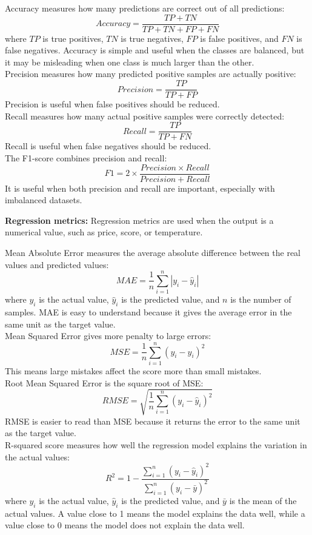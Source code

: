\documentclass[12pt,a4paper,oneside]{report}
\begin{document}
\noindent Accuracy measures how many predictions are correct out of all predictions:
\[
Accuracy = \frac{TP + TN}{TP + TN + FP + FN}
\]
\noindent where $TP$ is true positives, $TN$ is true negatives, $FP$ is false positives,
and $FN$ is false negatives. Accuracy is simple and useful when the classes are
balanced, but it may be misleading when one class is much larger than the other.\\
\noindent Precision measures how many predicted positive samples are actually positive:
\[
Precision = \frac{TP}{TP + FP}
\]
\noindent Precision is useful when false positives should be reduced.\\

\noindent Recall measures how many actual positive samples were correctly detected:
\[
Recall = \frac{TP}{TP + FN}
\]
\noindent Recall is useful when false negatives should be reduced.\\

\noindent The F1-score combines precision and recall:
\[
F1 = 2 \times \frac{Precision \times Recall}{Precision + Recall}
\]
\noindent It is useful when both precision and recall are important, especially with
imbalanced datasets.

\noindent\textbf{Regression metrics:}
Regression metrics are used when the output is a numerical value, such as price,
score, or temperature.

\noindent Mean Absolute Error measures the average absolute difference between the real
values and predicted values:
\[
MAE = \frac{1}{n}\sum_{i=1}^{n}|y_i - \hat{y}_i|
\]
\noindent where $y_i$ is the actual value, $\hat{y}_i$ is the predicted value, and $n$ is
the number of samples. MAE is easy to understand because it gives the average
error in the same unit as the target value.\\

\noindent Mean Squared Error gives more penalty to large errors:
\[
MSE = \frac{1}{n}\sum_{i=1}^{n}(y_i - \hat{y}_i)^2
\]
\noindent This means large mistakes affect the score more than small mistakes.\\

\noindent Root Mean Squared Error is the square root of MSE:
\[
RMSE = \sqrt{\frac{1}{n}\sum_{i=1}^{n}(y_i - \hat{y}_i)^2}
\]
\noindent RMSE is easier to read than MSE because it returns the error to the same unit as
the target value.\\

\noindent R-squared score measures how well the regression model explains the variation in
the actual values:
\[
R^2 = 1 - \frac{\sum_{i=1}^{n}(y_i - \hat{y}_i)^2}{\sum_{i=1}^{n}(y_i - \bar{y})^2}
\]
\noindent where $y_i$ is the actual value, $\hat{y}_i$ is the predicted value, and
$\bar{y}$ is the mean of the actual values. A value close to 1 means the model
explains the data well, while a value close to 0 means the model does not explain
the data well.
\end{document}
